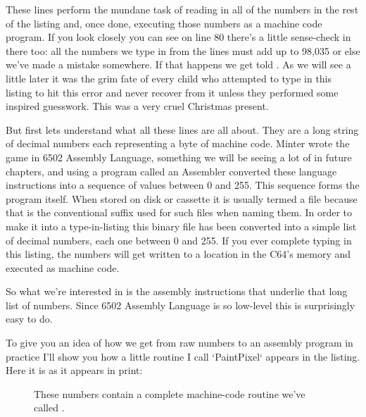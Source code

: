 These lines perform the mundane task of reading in all of the numbers in the
rest of the listing and, once done, executing those numbers as a machine code
program. If you look closely you can see on line 80 there's a little sense-check in there too: all the numbers
we type in from the  lines must add up to 98,035 or else we've made a mistake somewhere. If that happens
we get told . As we will see a little later it was the grim fate of every child who
attempted to type in this listing to hit this error and never recover from it unless they performed some
inspired guesswork. This was a very cruel Christmas present.

But first lets understand what all these  lines are all about. They are a long string of decimal
numbers each representing a byte of machine code. Minter wrote the game in 6502 Assembly Language, something
we will be seeing a lot of in future chapters, and using a program called an Assembler converted these
language instructions into a sequence of values between 0 and 255. This sequence forms the program itself.
When stored on disk or cassette it is usually termed a  file because that is the conventional
suffix used for such files when naming them. In order to make it into a type-in-listing this binary file
has been converted into a simple list of decimal numbers, each one between 0 and 255. If you ever complete
typing in this listing, the numbers will get written to a location in the C64's memory and executed as 
machine code.

So what we're interested in is the assembly instructions that underlie that long list of numbers. Since 
6502 Assembly Language is so low-level this is surprisingly easy to do.


To give you an idea of how we get from raw numbers to an assembly program in practice I'll show you how
a little routine I call `PaintPixel` appears in the listing. Here it is as it appears in print:

\begin{figure}[H]
    \centering
    \begin{adjustbox}{width=7cm,center}
    \end{adjustbox}
  \caption{These numbers contain a complete machine-code routine we've called .}
\end{figure}

